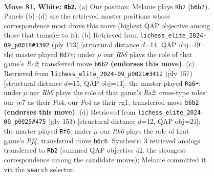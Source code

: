 \documentclass[11pt]{article}
\begin{document}
\clearpage

\begin{figure}[p]\centering
\begin{subfigure}{0.46\textwidth}\centering
\resizebox{\linewidth}{!}{%
\newchessgame
\chessboard[
  setfen={R7/2r2p2/1R2p3/7k/P3P3/5P1K/8/8 w - - 53 81},
  showmover=false,
  pgfstyle=straightmove, color=movearrow, markmove={b6-b2}
]}
\caption{}
\end{subfigure}\hfill
\begin{subfigure}{0.46\textwidth}\centering
\resizebox{\linewidth}{!}{%
\newchessgame
\chessboard[
  setfen={5k2/p1r5/5P2/3K4/p1P5/8/1P4R1/8 b - - 2 87},
  showmover=false,
  pgfstyle=straightmove, color=movearrow, markmove={c7-d7}
]}
\caption{}
\end{subfigure}
\\[4pt]
\begin{subfigure}{0.46\textwidth}\centering
\resizebox{\linewidth}{!}{%
\newchessgame
\chessboard[
  setfen={8/r4P1k/4K3/7p/pp3P2/8/8/6R1 b - - 9 79},
  showmover=false,
  pgfstyle=straightmove, color=movearrow, markmove={a7-a6}
]}
\caption{}
\end{subfigure}\hfill
\begin{subfigure}{0.46\textwidth}\centering
\resizebox{\linewidth}{!}{%
\newchessgame
\chessboard[
  setfen={8/6k1/R7/5r1p/6p1/6P1/5P2/6K1 b - - 47 77},
  showmover=false,
  pgfstyle=straightmove, color=movearrow, markmove={f5-f6}
]}
\caption{}
\end{subfigure}
\caption{\textbf{Move 81, White: \texttt{Rb2}.} (a) Our position; Melanie plays \texttt{Rb2} (\texttt{b6b2}). Panels (b)--(d) are the retrieved master positions whose correspondence most drove this move (highest QAP objective among those that transfer to it). (b) Retrieved from \texttt{lichess\_elite\_2024-09\_p0018\#1392} (ply 173) [structural distance $d$=14, QAP obj=19]: the master played \texttt{Rd7+}; under $\mu$ our \emph{Rb6} plays the role of that game's \emph{Rc2}; transferred move \texttt{b6b2} \textbf{(endorses this move)}. (c) Retrieved from \texttt{lichess\_elite\_2024-09\_p0021\#3412} (ply 157) [structural distance $d$=15, QAP obj=11]: the master played \texttt{Ra6+}; under $\mu$ our \emph{Rb6} plays the role of that game's \emph{Ra2}; cross-type roles: our \emph{r}c7 as their \emph{P}a4, our \emph{P}e4 as their \emph{r}g1; transferred move \texttt{b6b2} \textbf{(endorses this move)}. (d) Retrieved from \texttt{lichess\_elite\_2024-09\_p0025\#475} (ply 153) [structural distance $d$=12, QAP obj=21]: the master played \texttt{Rf6}; under $\mu$ our \emph{Rb6} plays the role of that game's \emph{Rf4}; transferred move \texttt{b6c6}. Synthesis: 3 retrieved analogs transferred to \texttt{Rb2} (summed QAP objective 42, the strongest correspondence among the candidate moves); Melanie committed it via the \texttt{search} selector.}
\label{fig:thought-m160}
\end{figure}
\end{document}
